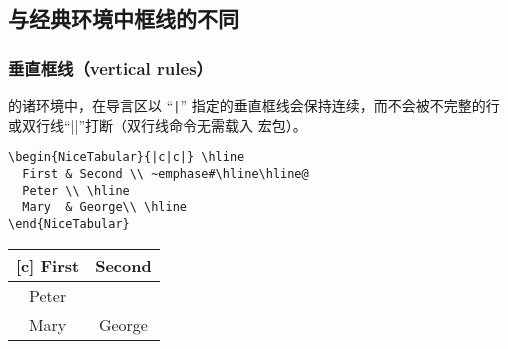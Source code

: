\documentclass[dvipsnames]{article}%
\begin{document}
\bigskip
\subsection{与经典环境中框线的不同}

\subsubsection{垂直框线（vertical rules）}


 的诸环境中，在导言区以 “\verb+|+” 指定的垂直框线会保持连续，而不会被不完整的行或双行线“|\hline \hline|”打断（双行线命令无需载入  宏包）。

\bigskip
\begin{BVerbatim}[baseline=c,boxwidth=10cm]
\begin{NiceTabular}{|c|c|} \hline
  First & Second \\ ~emphase#\hline\hline@
  Peter \\ \hline
  Mary  & George\\ \hline
\end{NiceTabular}
\end{BVerbatim}
\begin{NiceTabular}{|c|c|}[c] \hline
First & Second \\ \hline\hline
Peter \\ \hline
Mary  & George \\ \hline
\end{NiceTabular}


\bigskip
\end{document}
